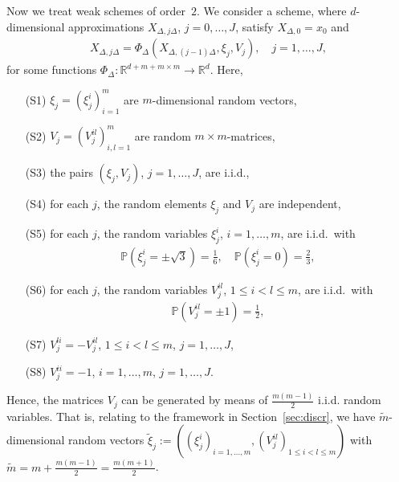 \documentclass[11pt,a4paper]{amsart}
\theoremstyle{plain}
\theoremstyle{definition}
\theoremstyle{remark}
\numberwithin{equation}{section}
\newcommand*{\PP}{\mathbb P}
\newcommand*{\bbR}{\mathbb R}
\begin{document}
Now we treat weak schemes of order~$2$.
We consider a scheme, where
$d$-dimensional approximations
$X_{\Delta,j\Delta}$, $j=0,\ldots,J$, satisfy
$X_{\Delta,0}=x_0$ and
\begin{align}
\label{eq:2002a5}
X_{\Delta,j\Delta}=
\Phi_{\Delta}(X_{\Delta,(j-1)\Delta},\xi_j,V_j),
\quad j=1,\ldots,J,
\end{align}
for some functions
$\Phi_{\Delta}\colon\bbR^{d+m+m\times m}\to\bbR^d$.
Here,
\begin{itemize}
\item[(S1)]
$\xi_j=(\xi_j^i)_{i=1}^m$
are $m$-dimensional random vectors,
\item[(S2)]
$V_j=(V_j^{il})_{i,l=1}^m$
are random $m\times m$-matrices,
\item[(S3)]
the pairs $(\xi_j,V_j)$, $j=1,\ldots,J$, are i.i.d.,
\item[(S4)]
for each $j$, the random elements $\xi_j$ and $V_j$
are independent,
\item[(S5)]
for each $j$, the random variables
$\xi_j^i$, $i=1,\ldots,m$, are i.i.d.\ with
\begin{align*}
\PP\left(\xi_j^i=\pm\sqrt{3}\right)=\frac16,
\quad
\PP\left(\xi_j^i=0\right)=\frac23,
\end{align*}
\item[(S6)]
for each $j$, the random variables
$V_j^{il}$, $1\le i<l\le m$, are i.i.d.\ with
\begin{align*}
\PP\left(V_j^{il}=\pm1\right)=\frac12,
\end{align*}
\item[(S7)]
$V_j^{li}=-V_j^{il}$, $1\le i<l\le m$, $j=1,\ldots,J$,
\item[(S8)]
$V_j^{ii}=-1$, $i=1,\ldots,m$, $j=1,\ldots,J$.
\end{itemize}
Hence, the matrices $V_j$ can be generated by means of $\frac{m(m-1)}{2}$ i.i.d. random variables. That is, relating to the framework in Section~\ref{sec:discr}, we have $\tilde m$-dimensional random vectors $\tilde\xi_j:=((\xi_j^i)_{i=1,\ldots,m},(V_j^{il})_{1\le i<l\le m})$ with $\tilde m=m+\frac{m(m-1)}{2}=\frac{m(m+1)}{2}$.
\end{document}

